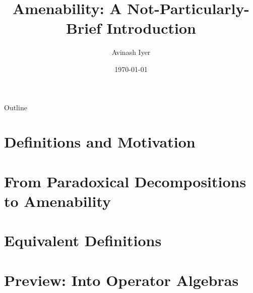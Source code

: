 \documentclass{beamer-custom}
\title{Amenability: A Not-Particularly-Brief Introduction}
\author{Avinash Iyer}
\institute{Occidental College}
\date{\today}
\begin{document}
\begin{frame}
    \titlepage
\end{frame}

\begin{frame}{Outline}
    \tableofcontents
\end{frame}
\section{Definitions and Motivation}%
\section{From Paradoxical Decompositions to Amenability}%
\section{Equivalent Definitions}%
\section{Preview: Into Operator Algebras}%
\end{document}
